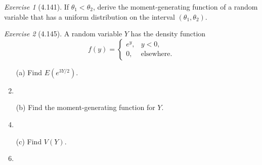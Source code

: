 \documentclass[12pt]{amsart}
\makeatletter
\theoremstyle{remark}
\newtheorem*{exercise}{Exercise}%
\renewenvironment{proof}[1][\proofname]{\par\doublespacing
  \pushQED{\qed}%
  \normalfont \topsep6\p@\@plus6\p@\relax
  \list{}{%
    \settowidth{\leftmargin}{\itshape\proofname:\hskip\labelsep}%
    \setlength{\labelwidth}{0pt}%
    \setlength{\itemindent}{-\leftmargin}%
  }%
  \item[\hskip\labelsep\itshape#1\@addpunct{:}]\ignorespaces
}{%
  \popQED\endlist\@endpefalse
  \singlespacing
}
\theoremstyle{mycomment}
\makeatother
\begin{document}
\begin{exercise}[4.141]
If $\theta_1 < \theta_2$, derive the moment-generating function of a random variable that has a uniform distribution on the interval $(\theta_1, \theta_2)$.

\begin{proof}[Solution]
 
\end{proof}
\end{exercise}

\begin{exercise}[4.145]
A random variable $Y$ has the density function
$$f(y) = \begin{cases}
e^y, & y < 0, \\
0, & \text{elsewhere}.
\end{cases}$$

\begin{enumerate}
    \item[(a)] Find $E(e^{3Y/2})$.
\begin{proof}[Solution]
 
\end{proof}
    \item[(b)] Find the moment-generating function for $Y$.
\begin{proof}[Solution]
 
\end{proof}
    \item[(c)] Find $V(Y)$.
\begin{proof}[Solution]
 
\end{proof}
\end{enumerate}
\end{exercise}
 
\end{document}
